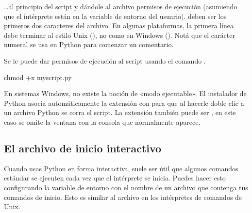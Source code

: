 \documentclass[a4,10pt,spanish]{sphinxmanual}
\begin{document}
\sphinxAtStartPar
…al principio del script y dándole al archivo permisos de ejecución (asumiendo que el intérprete están en la variable de entorno  del usuario).  \sphinxcode{\sphinxupquote{\#!}} deben ser los primeros dos caracteres del archivo.  En algunas plataformas, la primera línea debe terminar al estilo Unix (), no como en Windows ().  Notá que el carácter numeral  se usa en Python para comenzar un comentario.

\sphinxAtStartPar
Se le puede dar permisos de ejecución al script usando el comando .

\begin{sphinxVerbatim}[commandchars=\\\{\}]
 chmod +x myscript.py
\end{sphinxVerbatim}

\sphinxAtStartPar
En sistemas Windows, no existe la noción de «modo ejecutable».  El instalador de Python asocia automáticamente la extensión  con  para que al hacerle doble clic a un archivo Python se corra el script.  La extensión también puede ser , en este caso se omite la ventana con la consola que normalmente aparece.


\subsection{El archivo de inicio interactivo}
\label{\detokenize{tutorial/appendix:the-interactive-startup-file}}\label{\detokenize{tutorial/appendix:tut-startup}}
\sphinxAtStartPar
Cuando usas Python en forma interactiva, suele ser útil que algunos comandos estándar se ejecuten cada vez que el intérprete se inicia.  Puedes hacer esto configurando la variable de entorno  con el nombre de un archivo que contenga tus comandos de inicio.  Esto es similar al archivo  en los intérpretes de comandos de Unix.
\end{document}
